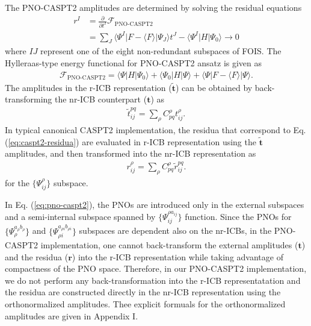\documentclass[aip,jcp,amsmath,twocolumn,floatfix,reprint,fleqn]{revtex4-1}
\begin{document}
The PNO-CASPT2 amplitudes are determined by solving the residual equations
%
\begin{align}
  r^I&=\frac{\partial}{\partial t^I}\mathscr{F}_\text{PNO-CASPT2} \nonumber \\
     &=\sum_J \langle\Psi^I|F-\langle F\rangle|\Psi_J\rangle t^J-\langle\Psi^I|H|\Psi_0\rangle\rightarrow 0 \label{eq:caspt2-residua}
\end{align}
%
where $IJ$ represent one of the eight non-redundant subspaces of FOIS.
%
The Hylleraas-type energy functional for PNO-CASPT2 ansatz is given as
%
\begin{align}
  \mathscr{F}_\text{PNO-CASPT2}=\langle\Psi|H|\Psi_0\rangle+\langle\Psi_0|H|\Psi\rangle+\langle\Psi|F-\langle F\rangle|\Psi\rangle.
\end{align}
%
The amplitudes in the r-ICB representation ($\tilde{\mathbf{t}}$) can be obtained by back-transforming the nr-ICB counterpart ($\mathbf{t}$) as
%
\begin{align}
  \tilde{t}^{pq}_{ij} = \sum_{\rho} C_{pq}^\rho  t^{\rho}_{ij}.
\end{align}
%
In typical canonical CASPT2 implementation, the residua that correspond to Eq. (\ref{eq:caspt2-residua}) are evaluated in r-ICB representation using the $\tilde{\mathbf{t}}$ amplitudes, and then transformed into the nr-ICB representation as
%
\begin{align}
  r^{\rho}_{ij}=\sum_{\rho} C_{pq}^\rho \tilde{r}^{pq}_{ij}.
\end{align}
for the $\{\Psi^{\rho}_{ij}\}$ subspace.

%
In Eq. (\ref{eq:pno-caspt2}), the PNOs are introduced only in the external subspaces and a semi-internal subspace spanned by $\{\Psi_{ij}^{\rho a_{ij}}\}$ function.
%
Since the PNOs for $\{\Psi_{\rho}^{a_{\rho}b_{\rho}}\}$ and $\{\Psi_{\rho i}^{a_{\rho i}b_{\rho i}}\}$ subspaces are dependent also on the nr-ICBs, in the PNO-CASPT2 implementation, one cannot back-transform the external amplitudes ($\mathbf{t}$) and the residua ($\mathbf{r}$) into the r-ICB representation while taking advantage of compactness of the PNO space.
%
Therefore, in our PNO-CASPT2 implementation, we do not perform any back-transformation into the r-ICB representatation and the residua are constructed directly in the nr-ICB representation using the orthonormalized amplitudes.
%
Thee explicit formuals for the orthonormalized amplitudes are given in Appendix I.
\end{document}
